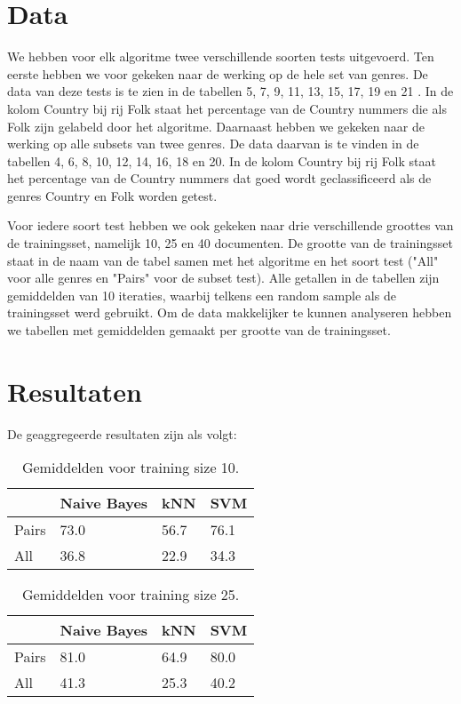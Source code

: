 \documentclass[a4paper,oneside]{article}
\begin{document}
\section{Data}
We hebben voor elk algoritme twee verschillende soorten tests uitgevoerd. Ten eerste hebben we voor gekeken naar de werking op de hele set van genres. De data van deze tests is te zien in de tabellen 5, 7, 9, 11, 13, 15, 17, 19 en 21 . In de kolom Country bij rij Folk staat het percentage van de Country nummers die als Folk zijn gelabeld door het algoritme. Daarnaast hebben we gekeken naar de werking  op alle subsets van twee genres. De data daarvan is te vinden in de tabellen 4, 6, 8, 10, 12, 14, 16, 18 en 20. In de kolom Country bij rij Folk staat het percentage van de Country nummers dat goed wordt geclassificeerd als de genres Country en Folk worden getest.

Voor iedere soort test hebben we ook gekeken naar drie verschillende groottes van de trainingsset, namelijk 10, 25 en 40 documenten. De grootte van de trainingsset staat in de naam van de tabel samen met het algoritme en het soort test ("All" voor alle genres en "Pairs" voor de subset test). Alle getallen in de tabellen zijn gemiddelden van 10 iteraties, waarbij telkens een random sample als de trainingsset werd gebruikt. Om de data makkelijker te kunnen analyseren hebben we tabellen met gemiddelden gemaakt per grootte van de trainingsset.

\section{Resultaten}
De geaggregeerde resultaten zijn als volgt:

\begin{table}[H]\centering
\caption{Gemiddelden voor training size 10.}
\begin{tabu}{l|l|l|l}
& Naive Bayes & kNN & SVM \\ \hline
Pairs & 73.0 & 56.7 & 76.1 \\
All & 36.8 & 22.9 & 34.3 \\
\end{tabu}
\end{table}

\begin{table}[H]\centering
\caption{Gemiddelden voor training size 25.}
\begin{tabu}{l|l|l|l}
& Naive Bayes & kNN & SVM \\ \hline
Pairs & 81.0 & 64.9 & 80.0 \\
All & 41.3 & 25.3 & 40.2 \\
\end{tabu}
\end{table}
\end{document}
